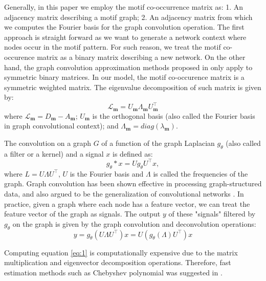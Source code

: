 \documentclass{article}
\theoremstyle{definition}
\begin{document}
Generally, in this paper we employ the motif co-occurrence matrix
as: 1. An adjacency matrix describing a motif graph; 2. An adjacency
matrix from which we computes the Fourier basis for the graph convolution
operation. The first approach is straight forward as we want to generate
a network context where nodes occur in the motif pattern. For such reason,
we treat the motif co-occurence matrix as a binary matrix describing a new
network. On the other hand, the graph convolution approximation methods 
proposed in \cite{gcn,defferrard2016convolutional} only apply to symmetric 
binary matrices. In our model, the motif co-occurence matrix is a symmetric 
weighted matrix. The eigenvalue decomposition of such matrix is given by:
\begin{equation} \label{eq:eigm}
\mathcal{L}_{\mathbf{m}} = U_{\mathbf{m}} \Lambda_{\mathbf{m}} U^{\top}_{\mathbf{m}}
\end{equation}
where $\mathcal{L}_{\mathbf{m}} = D_{\mathbf{m}} - A_{\mathbf{m}}$; $U_{\mathbf{m}}$ is the
orthogonal basis (also called the Fourier basis in graph convolutional context);
and $\Lambda_{\mathbf{m}} = diag(\lambda_{\mathbf{m}})$. 

The convolution on a graph $G$ of a function of the graph 
Laplacian $g_{\theta}$ (also called a filter or a kernel) 
and a signal $x$ is defined as:
$$g_{\theta} \ast x = U g_{\theta} U^{\top} x,$$
where $L = U \Lambda U^\top$, $U$ is the Fourier basis
and $\Lambda$ is called the frequencies of the graph. 
Graph convolution has been shown effective in processing
graph-structured data, and also argued to be the generalization
of convolutional networks \cite{shuman2013emerging,defferrard2016convolutional,gcn}.
In practice, given a graph where each node has a feature vector,
we can treat the feature vector of the graph as signals. The output $y$
of these "signals" filtered by $g_\theta$ on the graph is given by
the graph convolution and deconvolution operations: 
\begin{equation}
\label{eq:1}
y = g_\theta (U \Lambda U^\top) x = U (g_\theta(\Lambda) U^\top)x
\end{equation}

Computing equation \ref{eq:1} is computationally expensive
due to the matrix multiplication and eigenvector decomposition operations.
Therefore, fast estimation methods such as Chebyshev polynomial was suggested
in \cite{hammond2011wavelets}.
\end{document}
